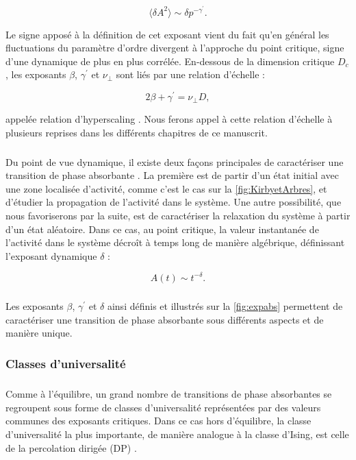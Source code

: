 \begin{equation}
	\langle \delta A^2\rangle \sim \delta p^{-\gamma^\prime}.
\end{equation}

\noindent Le signe apposé à la définition de cet exposant vient du fait qu'en général les fluctuations du paramètre d'ordre divergent à l'approche du point critique, signe d'une dynamique de plus en plus corrélée. En-dessous de la dimension critique $D_c$, les exposants $\beta$, $\gamma^\prime$ et $\nu_\perp$ sont liés par une relation d'échelle :

\begin{equation}
	2\beta + \gamma^\prime = \nu_\perp D,
\end{equation}

\noindent appelée relation d'hyperscaling \cite{lubeck_universal_2004}. Nous ferons appel à cette relation d'échelle à plusieurs reprises dans les différents chapitres de ce manuscrit.

\subparagraph{}Du point de vue dynamique, il existe deux façons principales de caractériser une transition de phase absorbante \cite{lubeck_universal_2004}. La première est de partir d'un état initial avec une zone localisée d'activité, comme c'est le cas sur la \autoref{fig:KirbyetArbres}, et d'étudier la propagation de l'activité dans le système. Une autre possibilité, que nous favoriserons par la suite, est de caractériser la relaxation du système à partir d'un état aléatoire. Dans ce cas, au point critique, la valeur instantanée de l'activité dans le système décroît à temps long de manière algébrique, définissant l'exposant dynamique $\delta$ :

\begin{equation}
	A(t) \sim t^{-\delta}.
\end{equation}

\subparagraph{}Les exposants $\beta$, $\gamma^\prime$ et $\delta$ ainsi définis et illustrés sur la \autoref{fig:expabs} permettent de caractériser une transition de phase absorbante sous différents aspects et de manière unique. 

\subsubsection{Classes d'universalité}

\subparagraph{}Comme à l'équilibre, un grand nombre de transitions de phase absorbantes se regroupent sous forme de classes d'universalité représentées par des valeurs communes des exposants critiques. Dans ce cas hors d'équilibre, la classe d'universalité la plus importante, de manière analogue à la classe d'Ising, est celle de la percolation dirigée (DP) \cite{hinrichsen_non_equilibrium_2000,lubeck_universal_2004}. 

